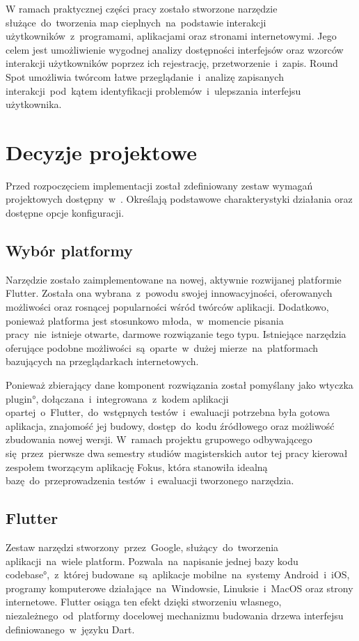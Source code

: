 W ramach praktycznej części pracy zostało stworzone narzędzie służące~do~tworzenia map cieplnych~na~podstawie interakcji użytkowników~z~programami, aplikacjami oraz stronami internetowymi. Jego celem jest umożliwienie wygodnej analizy dostępności interfejsów oraz wzorców interakcji użytkowników poprzez ich rejestrację, przetworzenie~i~zapis. Round Spot umożliwia twórcom łatwe przeglądanie~i~analizę zapisanych interakcji~pod~kątem identyfikacji problemów~i~ulepszania interfejsu użytkownika.

\section{Decyzje projektowe}

Przed rozpoczęciem implementacji został zdefiniowany zestaw wymagań projektowych dostępny~w~. Określają podstawowe charakterystyki działania oraz dostępne opcje konfiguracji.

\subsection{Wybór platformy}
Narzędzie zostało zaimplementowane na nowej, aktywnie rozwijanej platformie Flutter. Została ona wybrana~z~powodu swojej innowacyjności, oferowanych możliwości oraz rosnącej popularności wśród twórców aplikacji. Dodatkowo, ponieważ platforma jest stosunkowo młoda,~w~momencie pisania pracy~nie~istnieje otwarte, darmowe rozwiązanie tego typu. Istniejące narzędzia oferujące podobne możliwości~są~oparte~w~dużej mierze~na~platformach bazujących na przeglądarkach internetowych.

Ponieważ zbierający dane komponent rozwiązania został pomyślany jako wtyczka \ang{plugin}, dołączana~i~integrowana~z~kodem aplikacji opartej~o~Flutter,~do~wstępnych testów~i~ewaluacji potrzebna była gotowa aplikacja, znajomość jej budowy, dostęp~do~kodu źródłowego oraz możliwość zbudowania nowej wersji. W~ramach projektu grupowego odbywającego się~przez~pierwsze dwa semestry studiów magisterskich autor tej pracy kierował zespołem tworzącym aplikację Fokus, która stanowiła idealną bazę~do~przeprowadzenia testów~i~ewaluacji tworzonego narzędzia.

\subsection{Flutter}
Zestaw narzędzi stworzony~przez~Google, służący~do~tworzenia aplikacji~na~wiele platform. Pozwala~na~napisanie jednej bazy kodu \ang{codebase},~z~której budowane~są~aplikacje mobilne~na~systemy Android~i~iOS, programy komputerowe działające~na~Windowsie, Linuksie~i~MacOS oraz strony internetowe. Flutter osiąga ten efekt dzięki stworzeniu własnego, niezależnego~od~platformy docelowej mechanizmu budowania drzewa interfejsu definiowanego~w~języku Dart. 

